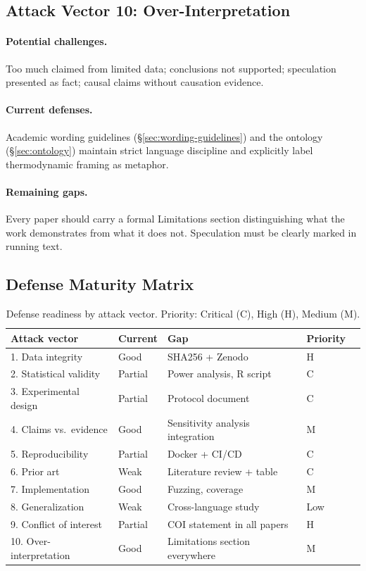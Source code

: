
\subsection{Attack Vector 10: Over-Interpretation}

\paragraph{Potential challenges.}
Too much claimed from limited data; conclusions not supported; speculation
presented as fact; causal claims without causation evidence.

\paragraph{Current defenses.}
Academic wording guidelines (\S\ref{sec:wording-guidelines}) and the ontology
(\S\ref{sec:ontology}) maintain strict language discipline and explicitly
label thermodynamic framing as metaphor.

\paragraph{Remaining gaps.}
Every paper should carry a formal Limitations section distinguishing what the
work demonstrates from what it does not. Speculation must be clearly marked in
running text.

\subsection{Defense Maturity Matrix}
\label{sec:defense-matrix}

\begin{table}[h]
\centering
\caption{Defense readiness by attack vector. Priority: Critical (C),
High (H), Medium (M).}
\label{tab:defense-matrix}
\begin{tabular}{lllll}
\toprule
\textbf{Attack vector} & \textbf{Current} & \textbf{Gap} & \textbf{Priority} \\
\midrule
1. Data integrity & Good & SHA256 + Zenodo & H \\
2. Statistical validity & Partial & Power analysis, R script & C \\
3. Experimental design & Partial & Protocol document & C \\
4. Claims vs.\ evidence & Good & Sensitivity analysis integration & M \\
5. Reproducibility & Partial & Docker + CI/CD & C \\
6. Prior art & Weak & Literature review + table & C \\
7. Implementation & Good & Fuzzing, coverage & M \\
8. Generalization & Weak & Cross-language study & Low \\
9. Conflict of interest & Partial & COI statement in all papers & H \\
10. Over-interpretation & Good & Limitations section everywhere & M \\
\bottomrule
\end{tabular}
\end{table}

